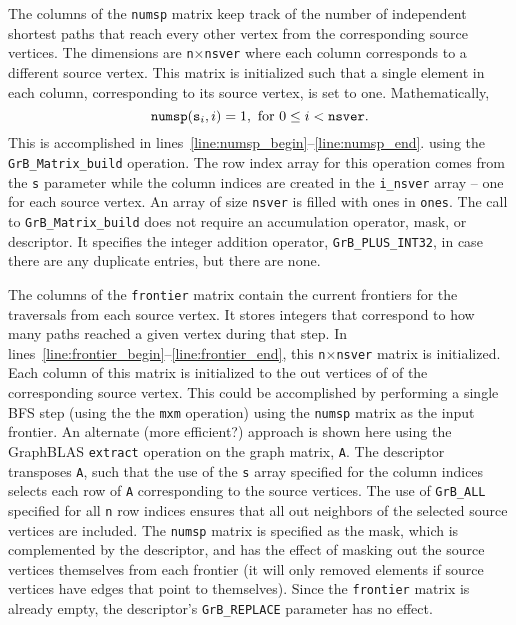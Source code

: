The columns of the {\tt numsp} matrix keep track of the number of independent 
shortest paths that reach every other vertex from the corresponding source 
vertices.  The dimensions are {\tt n}$\times${\tt nsver} where each column corresponds
to a different source vertex.  This matrix is initialized such that a single
element in each column, corresponding to its source vertex, 
is set to one.  Mathematically,
\begin{equation}
	{\tt numsp}({{\tt s}_i},i) = 1, \text{ for }  0 \leq i < {\tt nsver}.
\end{equation}
This is accomplished in lines~\ref{line:numsp_begin}--\ref{line:numsp_end}.
using the {\tt GrB\_Matrix\_build} operation.  The row index array for this operation comes from 
the {\tt s} parameter while the column indices are created in the {\tt i\_nsver}
array -- one for each source vertex.  An array of size {\tt nsver} is filled 
with ones in {\tt ones}.  The call to {\tt GrB\_Matrix\_build} does 
not require an accumulation operator, mask, or descriptor.  It specifies
the integer addition operator, {\tt GrB\_PLUS\_INT32}, in case there are any
duplicate entries, but there are none.

The columns of the {\tt frontier} matrix contain the current frontiers for the
traversals from each source vertex.  It stores integers that correspond to how
many paths reached a given vertex during that step. 
In lines~\ref{line:frontier_begin}--\ref{line:frontier_end}, this
{\tt n}$\times${\tt nsver} matrix is initialized.  Each column of this 
matrix is initialized to the out vertices of of the corresponding source
vertex.  This could be accomplished by performing a single BFS step (using the 
the {\tt mxm} operation) using the {\tt numsp} matrix as the input frontier.
An alternate (more efficient?) approach is shown here using the GraphBLAS {\tt extract}
operation on the graph matrix, {\tt A}.  The descriptor transposes {\tt A}, such that
the use of the {\tt s} array specified for the column indices selects
each row of {\tt A} corresponding to the source vertices.
The use of {\tt GrB\_ALL} specified for all {\tt n} row indices 
ensures that all out neighbors of the selected source vertices are included.  
The {\tt numsp} matrix
is specified as the mask, which is complemented by the descriptor, and has the
effect of masking out the source vertices themselves from 
each frontier (it will only removed elements if source vertices have edges that point
to themselves).  Since the {\tt frontier} matrix is already empty, the 
descriptor's {\tt GrB\_REPLACE} parameter has no effect.

